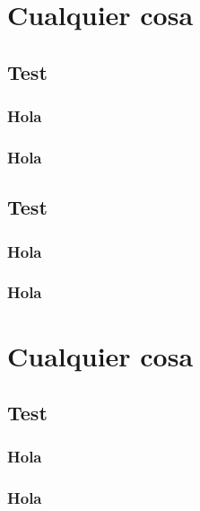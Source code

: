 \section{Cualquier cosa}
	\subsection{Test}
		\subsubsection{Hola}
		\subsubsection{Hola}
		
	\subsection{Test}
		\subsubsection{Hola}
		\subsubsection{Hola}
		
\section{Cualquier cosa}
	\subsection{Test}
		\subsubsection{Hola}
		\subsubsection{Hola}

